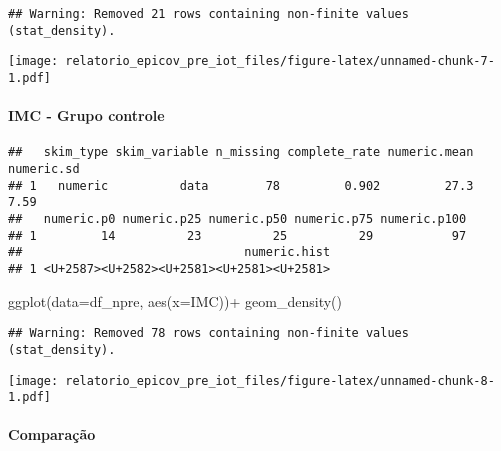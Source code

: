 \documentclass[
]{article}
\newenvironment{Shaded}{\begin{snugshade}}{\end{snugshade}}
\newcommand{\AttributeTok}[1]{\textcolor[rgb]{0.77,0.63,0.00}{#1}}
\newcommand{\FunctionTok}[1]{\textcolor[rgb]{0.00,0.00,0.00}{#1}}
\newcommand{\NormalTok}[1]{#1}
\newcommand{\SpecialCharTok}[1]{\textcolor[rgb]{0.00,0.00,0.00}{#1}}
\begin{document}
\begin{verbatim}
## Warning: Removed 21 rows containing non-finite values (stat_density).
\end{verbatim}

\texttt{[image: relatorio\_epicov\_pre\_iot\_files/figure-latex/unnamed-chunk-7-1.pdf]}

\hypertarget{imc---grupo-controle}{%
\paragraph{\texorpdfstring{\textbf{IMC - Grupo
controle}}{IMC - Grupo controle}}\label{imc---grupo-controle}}

\begin{Shaded}
\end{Shaded}

\begin{verbatim}
##   skim_type skim_variable n_missing complete_rate numeric.mean numeric.sd
## 1   numeric          data        78         0.902         27.3       7.59
##   numeric.p0 numeric.p25 numeric.p50 numeric.p75 numeric.p100
## 1         14          23          25          29           97
##                               numeric.hist
## 1 <U+2587><U+2582><U+2581><U+2581><U+2581>
\end{verbatim}

\begin{Shaded}
\begin{Highlighting}[]
\FunctionTok{ggplot}\NormalTok{(}\AttributeTok{data=}\NormalTok{df\_npre, }\FunctionTok{aes}\NormalTok{(}\AttributeTok{x=}\NormalTok{IMC))}\SpecialCharTok{+}
  \FunctionTok{geom\_density}\NormalTok{()}
\end{Highlighting}
\end{Shaded}

\begin{verbatim}
## Warning: Removed 78 rows containing non-finite values (stat_density).
\end{verbatim}

\texttt{[image: relatorio\_epicov\_pre\_iot\_files/figure-latex/unnamed-chunk-8-1.pdf]}

\hypertarget{comparauxe7uxe3o}{%
\paragraph{\texorpdfstring{\textbf{Comparação}}{Comparação}}\label{comparauxe7uxe3o}}
\end{document}
